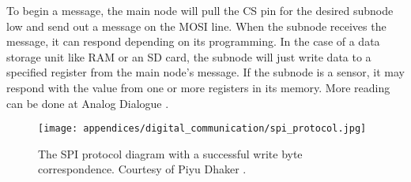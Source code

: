 To begin a message, the main node will pull the CS pin for the desired subnode low and send out a message on the MOSI line.
When the subnode receives the message, it can respond depending on its programming.
In the case of a data storage unit like RAM or an SD card, the subnode will just write data to a specified register from the main node's message.
If the subnode is a sensor, it may respond with the value from one or more registers in its memory.
More reading can be done at Analog Dialogue \cite{AnalogDialogue:SPI}.

\begin{figure}[h!]
    \caption[SPI protocol diagram]{The SPI protocol diagram with a successful write byte correspondence. 
    Courtesy of Piyu Dhaker \cite{AnalogDialogue:SPI}.}
    \centering
    \texttt{[image: appendices/digital\_communication/spi\_protocol.jpg]}
\end{figure}
